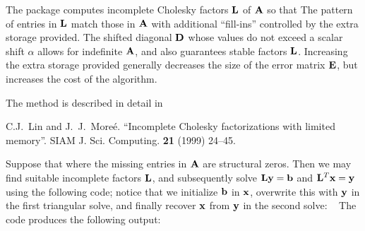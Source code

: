\documentclass{galahad}
\begin{document}

\galmethod
The package computes incomplete Cholesky factors ${\mathbf{L}}$ of ${\mathbf{A}}$ so that
The pattern of entries in ${\mathbf{L}}$ match those in ${\mathbf{A}}$ with additional
``fill-ins'' controlled by the extra storage provided. The shifted diagonal
${\mathbf{D}}$ whose values do not exceed a scalar shift $\alpha$ allows for
indefinite ${\mathbf{A}}$, and also guarantees stable factors ${\mathbf{L}}$. Increasing the
extra storage provided generally decreases the size of the error matrix
${\mathbf{E}}$, but increases the cost of the algorithm.

\vspace*{1mm}

\galreference
\vspace*{1mm}

\noindent
The method is described in detail in
\vspace*{1mm}

\noindent
C.\-J.\ Lin and J.\ J.\ More\'{e}. ``Incomplete Cholesky factorizations
with limited memory''.  SIAM J. Sci. Computing. {\bf 21} (1999) 24--45.


\galexamples
Suppose that
where the missing entries in ${\mathbf{A}}$ are structural zeros. Then we may find
suitable incomplete factors ${\mathbf{L}}$, and subsequently solve
${\mathbf{L}} {\mathbf{y}} = {\mathbf{b}}$ and ${\mathbf{L}}^T {\mathbf{x}} = {\mathbf{y}}$ using the following code;
notice that we initialize ${\mathbf{b}}$ in ${\mathbf{x}}$, overwrite this with ${\mathbf{y}}$ in the
first triangular solve, and finally recover ${\mathbf{x}}$ from ${\mathbf{y}}$
in the second solve:
{\tt \small
\VerbatimInput{\packageexample}
}
\noindent
The code produces the following output:
{\tt \small
\VerbatimInput{\packageresults}
}
\noindent
\end{document}
